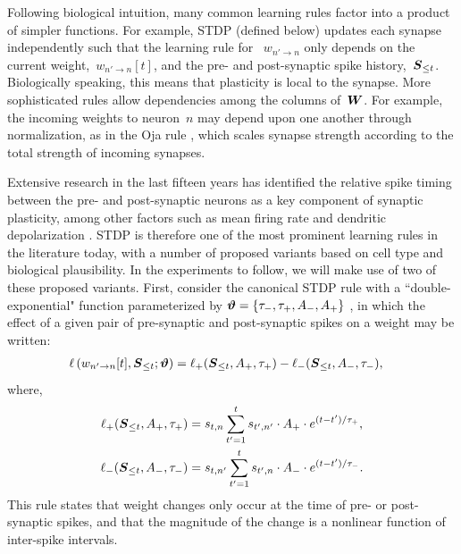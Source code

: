 Following biological intuition, many common learning rules factor into
a product of simpler functions. For example, STDP (defined below)
updates each synapse independently such that the learning rule for 
~$w_{n' \to n}$ only
depends on the current weight,~${w_{n'\to n}[t]}$, and the pre- and post-synaptic spike
history,~${\boldsymbol{S}_{\leq t}}$. Biologically speaking, this means that
plasticity is local to the synapse. More sophisticated rules allow
dependencies among the columns of~$\boldsymbol{W}$. For example, the incoming
weights to neuron~$n$ may depend upon one another through
normalization, as in the Oja rule \citep{Oja-1982}, which scales
synapse strength according to the total strength of incoming synapses.

\sloppy 
Extensive research in the last fifteen years has identified the
relative spike timing between the pre- and post-synaptic neurons as a
key component of synaptic plasticity, among other factors such as mean
firing rate and dendritic depolarization \citep{Feldman-2012}. STDP is
therefore one of the most prominent learning rules in the literature
today, with a number of proposed variants based on cell type and
biological plausibility. In the experiments to follow, we will make
use of two of these proposed variants. First, consider the canonical
STDP rule with a ``double-exponential" function parameterized by
${\boldsymbol{\vartheta} = \{\tau_-, \tau_+, A_-, A_+\}}$ \citep{Song-2000}, in which the
effect of a given pair of pre-synaptic and post-synaptic spikes on a
weight may be written:
\begin{align}
\label{eqn:AddSTDP}
 \ell\left(w_{n' \to n}[t], \boldsymbol{S}_{\leq t}; \boldsymbol{\vartheta} \right) &= 
 \ell_+(\boldsymbol{S}_{\leq t}, A_+, \tau_+) 
 -\ell_-(\boldsymbol{S}_{\leq t}, A_-, \tau_-),
\end{align}
where,
\begin{align*}
\ell_+(\boldsymbol{S}_{\leq t}, A_+, \tau_+) &= s_{t,n} \sum_{t'=1}^{t} s_{t', n'} \cdot  A_+ \cdot e^{(t-t')/\tau_+}, \\
\ell_-(\boldsymbol{S}_{\leq t}, A_-, \tau_-) &= s_{t,n'} \sum_{t'=1}^{t} s_{t', n} \cdot  A_- \cdot e^{(t-t')/\tau_-}.
\end{align*}
This rule states that weight changes only occur at the time of pre- or
post-synaptic spikes, and that the magnitude of the change is a
nonlinear function of inter-spike intervals.

